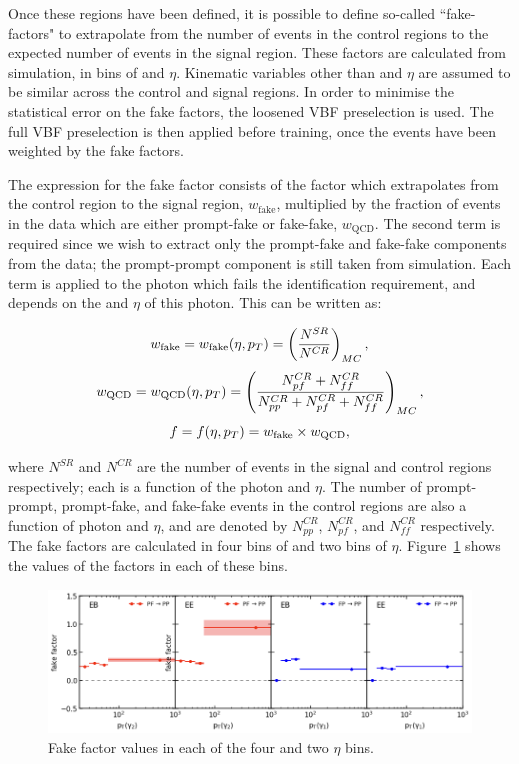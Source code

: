 Once these regions have been defined, it is possible to define so-called ``fake-factors" 
to extrapolate from the number of events in the control regions 
to the expected number of events in the signal region.
These factors are calculated from simulation, in bins of \pt and $\eta$.
Kinematic variables other than \pt and $\eta$ are assumed to be similar 
across the control and signal regions.
In order to minimise the statistical error on the fake factors, 
the loosened VBF preselection is used.
The full VBF preselection is then applied before training, 
once the events have been weighted by the fake factors.

The expression for the fake factor consists of the factor 
which extrapolates from the control region to the signal region, $w_{\textrm{fake}}$, 
multiplied by the fraction of events in the data which are either prompt-fake or fake-fake, 
$w_{\textrm{QCD}}$.
The second term is required since we wish to extract 
only the prompt-fake and fake-fake components from the data;
the prompt-prompt component is still taken from simulation.
Each term is applied to the photon which fails the identification requirement, 
and depends on the \pt and $\eta$ of this photon.
This can be written as:

\begin{equation*}
w_{\textrm{fake}} = w_{\textrm{fake}}(\eta,p_T)
= \left( \frac{N^{SR}} {N^{CR}} \right)_{MC} , 
\end{equation*}
\begin{equation*}
w_{\textrm{QCD}} = w_{\textrm{QCD}}(\eta,p_T)
= \left( \frac{N^{CR}_{pf} + N^{CR}_{ff}} {N^{CR}_{pp} + N^{CR}_{pf} + N^{CR}_{ff}} \right)_{MC} ,
\end{equation*}
\begin{equation*}
f = f(\eta,p_T) = w_{\textrm{fake}} \times w_{\textrm{QCD}} , 
\end{equation*}

where $N^{SR}$ and $N^{CR}$ are the number of events in the signal and control regions respectively;
each is a function of the photon \pt and $\eta$.
The number of prompt-prompt, prompt-fake, and fake-fake events in the control regions 
are also a function of photon \pt and $\eta$, 
and are denoted by $N^{CR}_{pp}$, $N^{CR}_{pf}$, and $N^{CR}_{ff}$ respectively.
The fake factors are calculated in four bins of \pt and two bins of $\eta$.
Figure~\ref{fig:cat_FakeFactors} shows the values of the factors in each of these bins.

\begin{figure}
  \centering
  \includegraphics[width=\textwidth]{Figures/Categorisation/fakeFactors.png}
  \caption{Fake factor values in each of the four \pt and two $\eta$ bins.}
  \label{fig:cat_FakeFactors}
\end{figure}

